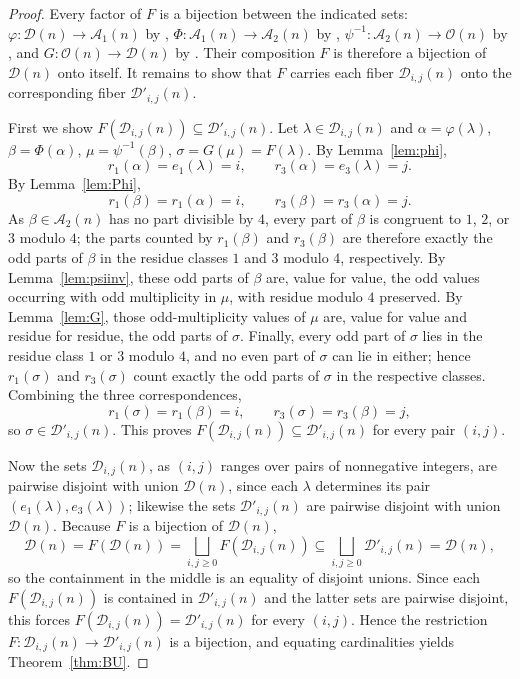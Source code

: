 \documentclass[11pt]{amsart}
\theoremstyle{definition}
\theoremstyle{remark}
\newcommand{\D}{\mathcal D}
\newcommand{\Oparts}{\mathcal O}
\newcommand{\Aone}{\mathcal A_1}
\newcommand{\Atwo}{\mathcal A_2}
\begin{document}
\begin{proof}
Every factor of $F$ is a bijection between the indicated sets: \(\varphi:\D(n)\to\Aone(n)\) by \cite[Lemma 2.2]{CGJL}, \(\Phi:\Aone(n)\to\Atwo(n)\) by \cite[Section 3]{CGJL}, \(\psi^{-1}:\Atwo(n)\to\Oparts(n)\) by \cite[Lemma 2.3]{CGJL}, and \(G:\Oparts(n)\to\D(n)\) by \cite{Glaisher}. Their composition $F$ is therefore a bijection of $\D(n)$ onto itself. It remains to show that $F$ carries each fiber $\D_{i,j}(n)$ onto the corresponding fiber $\D'_{i,j}(n)$.

First we show \(F(\D_{i,j}(n))\subseteq\D'_{i,j}(n)\). Let \(\lambda\in\D_{i,j}(n)\) and \(\alpha=\varphi(\lambda)\), \(\beta=\Phi(\alpha)\), \(\mu=\psi^{-1}(\beta)\), \(\sigma=G(\mu)=F(\lambda)\). By
Lemma~\ref{lem:phi},
\[
   r_1(\alpha)=e_1(\lambda)=i,\qquad r_3(\alpha)=e_3(\lambda)=j .
\]
By Lemma~\ref{lem:Phi},
\[
   r_1(\beta)=r_1(\alpha)=i,\qquad r_3(\beta)=r_3(\alpha)=j .
\]
As \(\beta\in\Atwo(n)\) has no part divisible by \(4\), every part of
\(\beta\) is congruent to \(1\), \(2\), or \(3\) modulo \(4\); the parts counted by
\(r_1(\beta)\) and \(r_3(\beta)\) are therefore exactly the odd parts of \(\beta\)
in the residue classes \(1\) and \(3\) modulo \(4\), respectively. By
Lemma~\ref{lem:psiinv}, these odd parts of \(\beta\) are, value for value, the odd values occurring with odd multiplicity in \(\mu\), with residue modulo \(4\)
preserved. By Lemma~\ref{lem:G}, those odd-multiplicity values of \(\mu\) are,
value for value and residue for residue, the odd parts of \(\sigma\). Finally,
every odd part of \(\sigma\) lies in the residue class \(1\) or \(3\) modulo \(4\),
and no even part of \(\sigma\) can lie in either; hence \(r_1(\sigma)\) and
\(r_3(\sigma)\) count exactly the odd parts of \(\sigma\) in the respective
classes. Combining the three correspondences,
\[
   r_1(\sigma)=r_1(\beta)=i,\qquad r_3(\sigma)=r_3(\beta)=j ,
\]
so \(\sigma\in\D'_{i,j}(n)\). This proves \(F(\D_{i,j}(n))\subseteq\D'_{i,j}(n)\) for every pair $(i,j)$.

Now the sets \(\D_{i,j}(n)\), as \((i,j)\) ranges over pairs of nonnegative integers, are pairwise disjoint with union \(\D(n)\), since each \(\lambda\) determines its pair \((e_1(\lambda),e_3(\lambda))\); likewise the sets \(\D'_{i,j}(n)\) are pairwise disjoint with union \(\D(n)\). Because \(F\) is a bijection of \(\D(n)\),
\[
   \D(n)=F(\D(n))=\bigsqcup_{i,j\ge 0} F(\D_{i,j}(n))
   \subseteq \bigsqcup_{i,j\ge 0} \D'_{i,j}(n)=\D(n),
\]
so the containment in the middle is an equality of disjoint unions. Since each \(F(\D_{i,j}(n))\) is contained in \(\D'_{i,j}(n)\) and the latter sets are pairwise disjoint, this forces
\(F(\D_{i,j}(n))=\D'_{i,j}(n)\) for every \((i,j)\). Hence the restriction \(F:\D_{i,j}(n)\to\D'_{i,j}(n)\) is a bijection, and equating cardinalities
yields Theorem~\ref{thm:BU}.
\end{proof}
\end{document}
